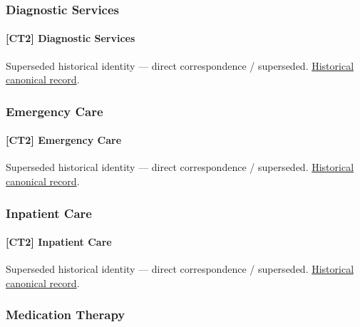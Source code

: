 \subsubsection{Diagnostic Services}

\paragraph{[CT2] Diagnostic Services}

\par\label{element:03a57e0c9ea34f7fb7b78e5f5c85379f}
Superseded historical identity — direct correspondence / superseded. \href{../../../../continuum/strategy/capability/03a57e0c9ea34f7fb7b78e5f5c85379f.md}{Historical canonical record}.\par

\subsubsection{Emergency Care}

\paragraph{[CT2] Emergency Care}

\par\label{element:e5edbb54258c490aaba0816d980dc624}
Superseded historical identity — direct correspondence / superseded. \href{../../../../continuum/strategy/capability/e5edbb54258c490aaba0816d980dc624.md}{Historical canonical record}.\par

\subsubsection{Inpatient Care}

\paragraph{[CT2] Inpatient Care}

\par\label{element:bcc40a14465e48aca42c9505a6853081}
Superseded historical identity — direct correspondence / superseded. \href{../../../../continuum/strategy/capability/bcc40a14465e48aca42c9505a6853081.md}{Historical canonical record}.\par

\subsubsection{Medication Therapy}

